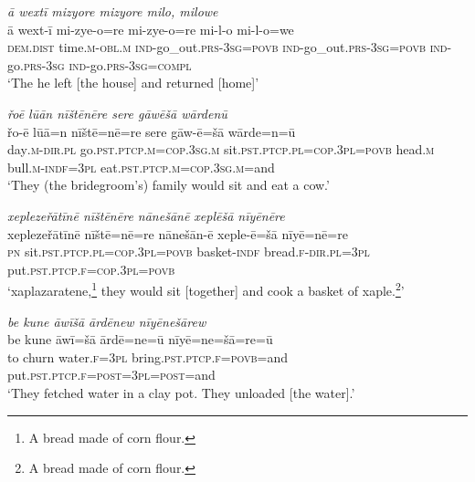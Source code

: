 \ea \label{ŽH.106}
\textit{ā wextī mizyore mizyore milo, milowe} \\ 
\gll ā wext-ī mi-zye-o=re mi-zye-o=re mi-l-o mi-l-o=we \\ 
 \textsc{dem.dist} time\textsc{.m}\textsc{-obl}\textsc{.m} \textsc{ind-}go\_out\textsc{.prs}\textsc{-3sg}\textsc{=\textsc{povb}} \textsc{ind-}go\_out\textsc{.prs}\textsc{-3sg}\textsc{=\textsc{povb}} \textsc{ind-}go\textsc{.prs}\textsc{-3sg} \textsc{ind-}go\textsc{.prs}\textsc{-3sg}\textsc{=compl} \\ 
\glt `The he left [the house] and returned [home]'
\z 
 
\ea \label{RE.13}
\textit{řoē lūān nīštēnēre sere gāwēšā wārdenū} \\ 
\gll řo-ē lūā=n nīštē=nē=re sere gāw-ē=šā wārde=n=ū \\ 
 day\textsc{.m}\textsc{-dir}\textsc{.pl} go\textsc{.pst}\textsc{.ptcp}\textsc{.m}\textsc{=cop}\textsc{.3sg}\textsc{.m} sit\textsc{.pst}\textsc{.ptcp}\textsc{.pl}\textsc{=cop}\textsc{.3pl}\textsc{=\textsc{povb}} head\textsc{.m} bull\textsc{.m}\textsc{-indf}\textsc{=3pl} eat\textsc{.pst}\textsc{.ptcp}\textsc{.m}\textsc{=cop}\textsc{.3sg}\textsc{.m}=and \\ 
\glt `They (the bridegroom’s) family would sit and eat a cow.'
\z 
 
\ea \label{RE.24}
\textit{xeplezeřātīnē nīštēnēre nānešānē xeplēšā nīyēnēre} \\ 
\gll xeplezeřātīnē nīštē=nē=re nānešān-ē xeple-ē=šā nīyē=nē=re \\ 
 \textsc{pn} sit\textsc{.pst}\textsc{.ptcp}\textsc{.pl}\textsc{=cop}\textsc{.3pl}\textsc{=\textsc{povb}} basket\textsc{-indf} bread\textsc{.f}\textsc{-dir}\textsc{.pl}\textsc{=3pl} put\textsc{.pst}\textsc{.ptcp}\textsc{.f}\textsc{=cop}\textsc{.3pl}\textsc{=\textsc{povb}} \\ 
\glt `xaplazaratene,\footnote{A bread made of corn flour.} they would sit [together] and cook a basket of xaple.\footnote{A bread made of corn flour.}'
\z 
 
\ea \label{ŽE.17}
\textit{be kune āwīšā ārdēnew nīyēnešārew} \\ 
\gll be kune āwī=šā ārdē=ne=ū nīyē=ne=šā=re=ū \\ 
 to churn water\textsc{.f}\textsc{=3pl} bring\textsc{.pst}\textsc{.ptcp}\textsc{.f}\textsc{=\textsc{povb}}=and put\textsc{.pst}\textsc{.ptcp}\textsc{.f}\textsc{=\textsc{post}}\textsc{=3pl}\textsc{=\textsc{post}}=and \\ 
\glt `They fetched water in a clay pot. They unloaded [the water].'
\z 
 

